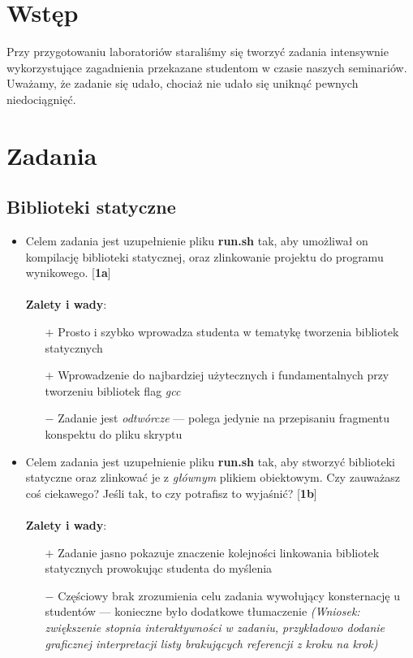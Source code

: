\documentclass[12pt]{article}
\begin{document}

\tableofcontents
\pagebreak


\section{Wstęp}
Przy przygotowaniu laboratoriów staraliśmy się tworzyć zadania intensywnie
wykorzystujące zagadnienia przekazane studentom w czasie naszych seminariów.
Uważamy, że zadanie się udało, chociaż nie udało się uniknąć pewnych
niedociągnięć.

\section{Zadania}
\subsection{Biblioteki statyczne}
\begin{itemize}
\item Celem zadania jest uzupełnienie pliku \textbf{run.sh} tak, aby umożliwał
  on kompilację biblioteki statycznej, oraz zlinkowanie projektu do programu
  wynikowego. [\textbf{1a}]\\ \\
  \textbf{Zalety i wady}:
  \begin{itemize}
  \item[$+$] Prosto i szybko wprowadza studenta w tematykę tworzenia bibliotek
    statycznych
  \item[$+$] Wprowadzenie do najbardziej użytecznych i fundamentalnych przy
    tworzeniu bibliotek flag \textit{gcc}
  \item[$-$] Zadanie jest \textit{odtwórcze} --- polega jedynie na przepisaniu
    fragmentu konspektu do pliku skryptu
  \end{itemize}
\item Celem zadania jest uzupełnienie pliku \textbf{run.sh} tak, aby stworzyć
  biblioteki statyczne oraz zlinkować je z \textit{głównym} plikiem obiektowym.
  Czy zauważasz coś ciekawego? Jeśli tak, to czy potrafisz to wyjaśnić?
  [\textbf{1b}]\\ \\
  \textbf{Zalety i wady}:
  \begin{itemize}
  \item[$+$] Zadanie jasno pokazuje znaczenie kolejności linkowania bibliotek
    statycznych prowokując studenta do myślenia
  \item[$-$] Częściowy brak zrozumienia celu zadania wywołujący konsternację u
    studentów --- konieczne było dodatkowe tłumaczenie \textit{(Wniosek:
      zwiększenie stopnia interaktywności w zadaniu, przykładowo dodanie
      graficznej interpretacji listy brakujących referencji z kroku na krok)}
  \end{itemize}
\end{itemize}
\end{document}
